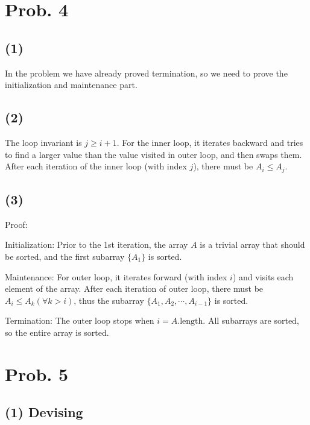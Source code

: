 \documentclass[12pt]{article}
\begin{document}
\section{Prob. 4}
\subsection{(1)}
In the problem we have already proved termination, so we need to prove the initialization and maintenance part.

\subsection{(2)}
The loop invariant is $j \geq i + 1$. For the inner loop, it iterates backward and tries to find a larger value than the value visited in outer loop, and then swaps them. After each iteration of the inner loop (with index $j$), there must be $A_i \leq A_j$.

\subsection{(3)}
Proof:

Initialization: Prior to the 1st iteration, the array $A$ is a trivial array that should be sorted, and the first subarray $\{A_1\}$ is sorted.

Maintenance: For outer loop, it iterates forward (with index $i$) and visits each element of the array. After each iteration of outer loop, there must be $A_i \leq A_k (\forall k > i)$, thus the subarray $\{A_1,A_2,\cdots,A_{i-1}\}$ is sorted.

Termination: The outer loop stops when $i = A.\mathrm{length}$. All subarrays are sorted, so the entire array is sorted.

\section{Prob. 5}

\subsection{(1) Devising}
\end{document}
